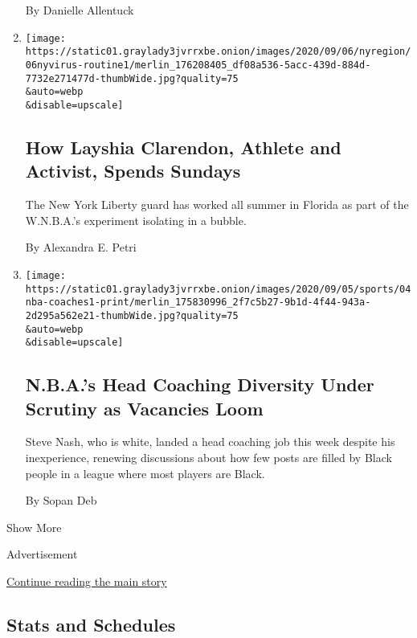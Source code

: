 \begin{enumerate}
  By Danielle Allentuck
\item
  \href{/2020/09/04/nyregion/coronavirus-Layshia-Clarendon-wnba.html}{}

  \texttt{[image: https://static01.graylady3jvrrxbe.onion/images/2020/09/06/nyregion/06nyvirus-routine1/merlin\_176208405\_df08a536-5acc-439d-884d-7732e271477d-thumbWide.jpg?quality=75\\\&auto=webp\\\&disable=upscale]}

  \hypertarget{how-layshia-clarendon-athlete-and-activist-spends-sundays}{%
  \subsection{How Layshia Clarendon, Athlete and Activist, Spends
  Sundays}\label{how-layshia-clarendon-athlete-and-activist-spends-sundays}}

  The New York Liberty guard has worked all summer in Florida as part of
  the W.N.B.A.'s experiment isolating in a bubble.

  By Alexandra E. Petri
\item
  \href{/2020/09/04/sports/basketball/nba-black-coaches-diversity.html}{}

  \texttt{[image: https://static01.graylady3jvrrxbe.onion/images/2020/09/05/sports/04nba-coaches1-print/merlin\_175830996\_2f7c5b27-9b1d-4f44-943a-2d295a562e21-thumbWide.jpg?quality=75\\\&auto=webp\\\&disable=upscale]}

  \hypertarget{nbas-head-coaching-diversity-under-scrutiny-as-vacancies-loom}{%
  \subsection{N.B.A.'s Head Coaching Diversity Under Scrutiny as
  Vacancies
  Loom}\label{nbas-head-coaching-diversity-under-scrutiny-as-vacancies-loom}}

  Steve Nash, who is white, landed a head coaching job this week despite
  his inexperience, renewing discussions about how few posts are filled
  by Black people in a league where most players are Black.

  By Sopan Deb
\end{enumerate}

Show More

Advertisement

\protect\hyperlink{after-mid1}{Continue reading the main story}

\hypertarget{stats-and-schedules}{%
\subsection{Stats and Schedules}\label{stats-and-schedules}}

